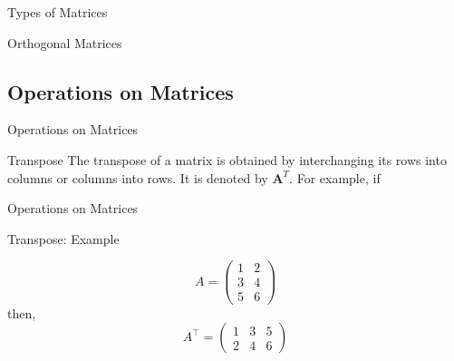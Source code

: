 \documentclass[aspectratio=169,xcolor=dvipsnames,svgnames,x11names,fleqn]{beamer}
\begin{document}
\begin{frame}{Types of Matrices}
\begin{tblock}{Orthogonal Matrices}
\end{tblock}



\end{frame}



\subsection{Operations on Matrices}

\begin{frame}
    \subsectionpage
\end{frame}


\begin{frame}[containsverbatim]{Operations on Matrices}

\begin{tblock}{Transpose}
The transpose of a matrix is obtained by interchanging its rows into columns or columns into rows. It is denoted by $\mathbf{A}^T$. For example, if 

\end{tblock}

\end{frame}

\begin{frame}[containsverbatim]{Operations on Matrices}



\begin{tblock}{Transpose: Example}


\begin{equation}
    A = \begin{pmatrix}
        1 & 2\\
        3 & 4\\
        5 & 6
    \end{pmatrix}
\end{equation}
then,
\begin{equation}
    A^\top = \begin{pmatrix}
        1 & 3 & 5\\
        2 & 4 & 6
    \end{pmatrix}
\end{equation}
\end{tblock}

\end{frame}
\end{document}
